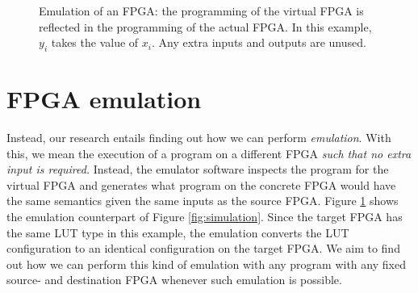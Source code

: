 \begin{figure}
    \caption{Emulation of an FPGA: the programming of the virtual FPGA is reflected in the programming of the actual FPGA. In this example, $y_i$ takes the value of $x_i$. Any extra inputs and outputs are unused.}
    \label{fig:emulation}
\end{figure}

\section{FPGA emulation}
Instead, our research entails finding out how we can perform \textit{emulation}. With this, we mean the execution of a program on a different FPGA \textit{such that no extra input is required.} Instead, the emulator software inspects the program for the virtual FPGA and generates what program on the concrete FPGA would have the same semantics given the same inputs as the source FPGA. Figure \ref{fig:emulation} shows the emulation counterpart of Figure \ref{fig:simulation}. Since the target FPGA has the same LUT type in this example, the emulation converts the LUT configuration to an identical configuration on the target FPGA. We aim to find out how we can perform this kind of emulation with any program with any fixed source- and destination FPGA whenever such emulation is possible.
